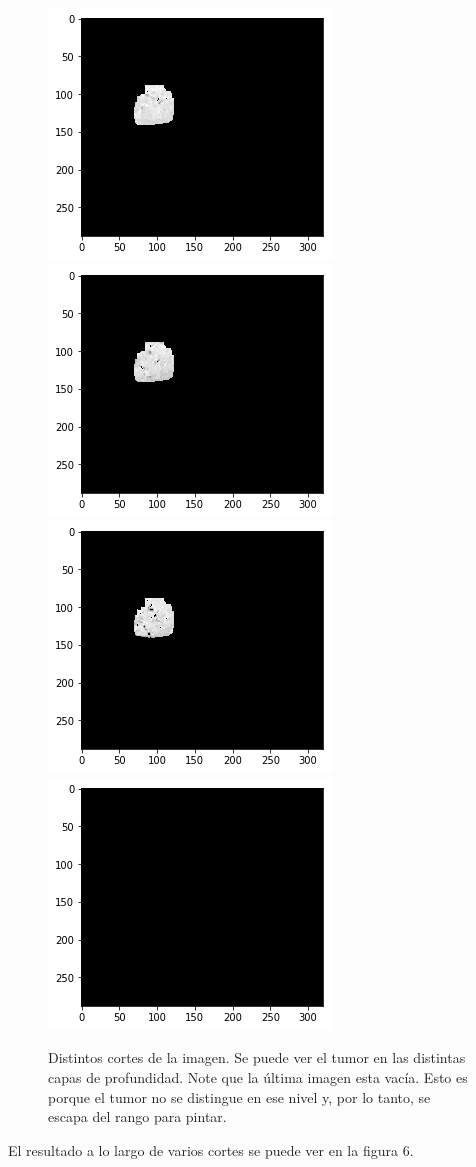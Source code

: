 \documentclass[conference]{IEEEtran}
\begin{document}
\begin{figure}
\begin{center}
\includegraphics[scale=0.4]{img/5.png} 
\includegraphics[scale=0.4]{img/6.png}\\
\includegraphics[scale=0.4]{img/7.png} 
\includegraphics[scale=0.4]{img/8.png}  
\end{center}
\caption{Distintos cortes de la imagen. Se puede ver el tumor en las distintas capas de profundidad. Note que la última imagen esta vacía. Esto es porque el tumor no se distingue en ese nivel y, por lo tanto, se escapa del rango para pintar.}
\end{figure}
El resultado a lo largo de varios cortes se puede ver en la figura 6.
\end{document}
